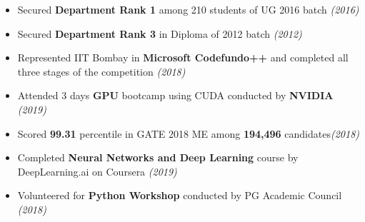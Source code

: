 \documentclass[a4paper,10pt]{article}
\begin{document}
\begin{itemize}[noitemsep,nolistsep]
    \item Secured \textbf{Department Rank 1} among 210 students of UG 2016 batch \hfill\emph{(2016)}
    \item Secured \textbf{Department Rank 3} in Diploma of 2012 batch \hfill\emph{(2012)}
       \item Represented IIT Bombay in \textbf{Microsoft Codefundo++} and completed all three stages of the competition \hfill\emph{(2018)}
    \item Attended 3 days \textbf{GPU} bootcamp using CUDA conducted by \textbf{NVIDIA} \hfill\emph{(2019)}
      \item Scored \textbf{99.31} percentile in GATE 2018 ME among \textbf{194,496} candidates\hfill\emph{(2018)}
    \item  Completed \textbf{Neural Networks and Deep Learning} course by DeepLearning.ai on Coursera \hfill\emph{(2019)}
    \item Volunteered for \textbf{Python Workshop} conducted by PG Academic Council \hfill\emph{(2018)}
\end{itemize}
  \vspace{0.2cm}
\end{document}
